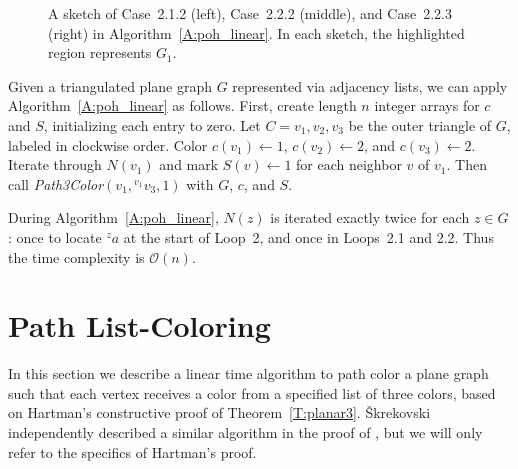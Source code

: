 \documentclass[12pt,letterpaper]{article}
\newcommand{\adj}[2]{{}^{#1}{#2}}
\theoremstyle{plain}
\theoremstyle{definition}
\theoremstyle{break}
\begin{document}
\begin{figure}
\begin{center}
\caption{A sketch of Case~2.1.2 (left),
Case~2.2.2 (middle), and Case~2.2.3 (right)
in Algorithm~\ref{A:poh_linear}. In each sketch,
the highlighted region represents
$G_1$.}\label{F:poh_linear_1}
\end{center}
\end{figure}

Given a triangulated plane graph $G$ represented via adjacency lists,
we can apply
Algorithm~\ref{A:poh_linear} as follows. First, create length $n$ integer
arrays for $c$ and $S$, initializing each entry to zero.
Let $C=v_1,v_2,v_3$ be the outer triangle of $G$,
labeled in clockwise order.
Color $c(v_1)\leftarrow 1$, $c(v_2)\leftarrow 2$, and
$c(v_3)\leftarrow 2$.
Iterate through $N(v_1)$ and mark $S(v)\leftarrow 1$ for each
neighbor $v$ of $v_1$.
Then call \emph{Path3Color}$(v_1, \adj{v_1}{v_3}, 1)$
with $G$, $c$, and $S$.

During Algorithm~\ref{A:poh_linear}, $N(z)$
is iterated exactly twice for each $z\in G$:
once to locate $\adj{z}{a}$
at the start of Loop~2,
and once in Loops~2.1 and 2.2.
Thus the time complexity is
$\mathcal{O}(n)$.

\section{Path List-Coloring}\label{S:path_choose}

In this section we describe a linear time algorithm to path color
a plane graph such that each vertex receives a color from a specified list
of three colors,
based on Hartman's constructive proof of Theorem~\ref{T:planar3}.
\v{S}krekovski independently described a similar algorithm in
the proof of \cite[Thm.~2.2b]{Skr1999}, but we will only refer to
the specifics of Hartman's proof.
\end{document}
